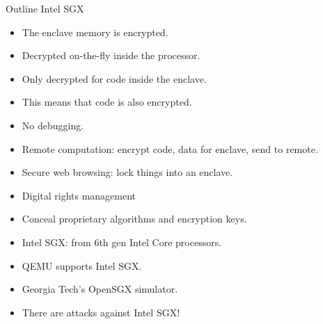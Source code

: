\begin{frame}
  \begin{block}{Outline Intel SGX}
    \begin{itemize}
      \item The enclave memory is encrypted.
      \item Decrypted on-the-fly inside the processor.
      \item Only decrypted for code inside the enclave.
    \end{itemize}
  \end{block}

  \pause

  \begin{remark}
    \begin{itemize}
      \item This means that code is also encrypted.
      \item No debugging.
    \end{itemize}
  \end{remark}
\end{frame}

\begin{frame}
  \begin{example}[Uses]
    \begin{itemize}
      \item Remote computation: encrypt code, data for enclave, send to remote.
      \item Secure web browsing: lock things into an enclave.
      \item Digital rights management
      \item Conceal proprietary algorithms and encryption keys.
    \end{itemize}
  \end{example}
\end{frame}

\begin{frame}
  \begin{example}[Implementations]
    \begin{itemize}
      \item Intel SGX: from 6th gen Intel Core processors.
      \item QEMU supports Intel SGX.
      \item Georgia Tech's OpenSGX simulator.
    \end{itemize}
  \end{example}
\end{frame}

\begin{frame}
  \begin{remark}
    \begin{itemize}
      \item There are attacks against Intel SGX!
    \end{itemize}
  \end{remark}
\end{frame}
